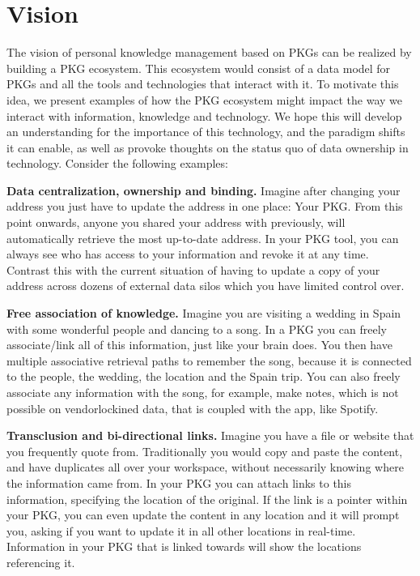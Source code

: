\section{Vision}
The vision of personal knowledge management based on PKGs can be realized by building a PKG ecosystem. This ecosystem would consist of a data model for PKGs and all the tools and technologies that interact with it. To motivate this idea, we present examples of how the PKG ecosystem might impact the way we interact with information, knowledge and technology. We hope this will develop an understanding for the importance of this technology, and the paradigm shifts it can enable, as well as provoke thoughts on the status quo of data ownership in technology. Consider the following examples:

\textbf{Data centralization, ownership and binding.} Imagine after changing your address you just have to update the address in one place: Your PKG. From this point onwards, anyone you shared your address with previously, will automatically retrieve the most up-to-date address. In your PKG tool, you can always see who has access to your information and revoke it at any time. Contrast this with the current situation of having to update a copy of your address across dozens of external data silos which you have limited control over.

\textbf{Free association of knowledge.} Imagine you are visiting a wedding in Spain with some wonderful people and dancing to a song. In a PKG you can freely associate/link all of this information, just like your brain does. You then have multiple associative retrieval paths to remember the song, because it is connected to the people, the wedding, the location and the Spain trip. You can also freely associate any information with the song, for example, make notes, which is not possible on \gls{vendorlockin}ed data, that is coupled with the app, like Spotify.

\textbf{Transclusion and bi-directional links.} Imagine you have a file or website that you frequently quote from. Traditionally you would copy and paste the content, and have duplicates all over your workspace, without necessarily knowing where the information came from. In your PKG you can attach links to this information, specifying the location of the original. If the link is a pointer within your PKG, you can even update the content in any location and it will prompt you, asking if you want to update it in all other locations in real-time. Information in your PKG that is linked towards will show the locations referencing it.





